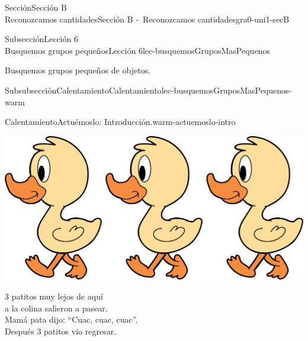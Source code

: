 \begin{sectionptx}{Sección}{{\Large Sección B\\}Reconozcamos cantidades}{}{Sección B -~Reconozcamos cantidades}{}{}{gra0-uni1-secB}
%
%
\typeout{************************************************}
\typeout{************************************************}
%
\begin{subsectionptx}{Subsección}{{\normalsize Lección 6\\[-0.05cm]}Busquemos grupos pequeños}{}{Lección 6}{}{}{lec-busquemosGruposMasPequenos}
\begin{introduction}{}%
Busquemos grupos pequeños de objetos.%
\end{introduction}%
%
%
\typeout{************************************************}
\typeout{************************************************}
%
\begin{subsubsectionptx}{Subsubsección}{Calentamiento}{}{Calentamiento}{}{}{lec-busquemosGruposMasPequenos-warm}
\begin{exploration}{Calentamiento}{Actuémoslo: Introducción.}{warm-actuemoslo-intro}%
\begin{image}{0.1}{0.8}{0.1}{}%
\includegraphics[max width=\linewidth, center]{external/png-source/3 ducks.png}
\end{image}%
\par
\vspace*{2ex}
3 patitos muy lejos de aquí\\
 a la colina salieron a pasear.\\
 Mamá pata dijo: “Cuac, cuac, cuac”.\\
 Después 3 patitos vio regresar.%
\end{exploration}%
\end{subsubsectionptx}
%
%
\typeout{************************************************}

\end{subsectionptx}
\end{sectionptx}
